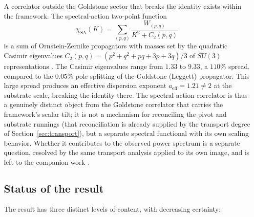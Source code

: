 \documentclass[12pt]{article}
\theoremstyle{definition}
\theoremstyle{remark}
\begin{document}
A correlator outside the Goldstone sector that breaks the identity exists within the framework. The spectral-action two-point function
\begin{equation}
  \chi_{\mathrm{SA}}(K) = \sum_{(p,q)} \frac{W_{(p,q)}}{K^2 + C_2(p,q)}
\end{equation}
is a sum of Ornstein-Zernike propagators with masses set by the quadratic Casimir eigenvalues $C_2(p,q) = (p^2 + q^2 + pq + 3p + 3q)/3$ of $SU(3)$ representations \citep{ChamseddineConnes1997}. The Casimir eigenvalues range from $1.33$ to $9.33$, a $110\%$ spread, compared to the $0.05\%$ pole splitting of the Goldstone (Leggett) propagator. This large spread produces an effective dispersion exponent $a_{\mathrm{eff}} = 1.21 \neq 2$ at the substrate scale, breaking the identity there. The spectral-action correlator is thus a genuinely distinct object from the Goldstone correlator that carries the framework's scalar tilt; it is not a mechanism for reconciling the pivot and substrate runnings (that reconciliation is already supplied by the transport degree of Section~\ref{sec:transport}), but a separate spectral functional with its own scaling behavior. Whether it contributes to the observed power spectrum is a separate question, resolved by the same transport analysis applied to its own image, and is left to the companion work \citep{PhononExflation}.

\subsection{Status of the result}

The result has three distinct levels of content, with decreasing certainty:
\end{document}
